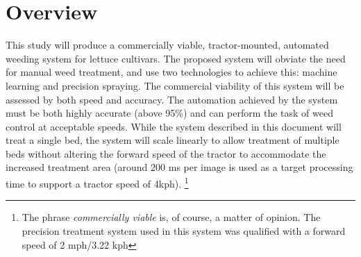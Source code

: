\documentclass[12pt]{article}
\begin{document}
%
%

%
%

\section{Overview}

\label{section:proposal}
This study will produce a commercially viable, tractor-mounted, automated weeding system for lettuce cultivars. The proposed system will obviate the need for manual weed treatment, and use two technologies to achieve this: machine learning and precision spraying. The commercial viability of this system will be assessed by both speed and accuracy. The automation achieved by the system must be both highly accurate (above 95\%) and  can perform the task of weed control at acceptable speeds. While the system described in this document will treat a single bed, the system will scale linearly to allow treatment of multiple beds without altering the forward speed of the tractor to accommodate the increased treatment area (around 200 ms per image is used as a target processing time to support a tractor speed of 4kph). \footnote{The phrase \textit{commercially viable} is, of course, a matter of opinion. The precision treatment system used in this system was qualified with a forward speed of 2 mph/3.22 kph}
\end{document}
